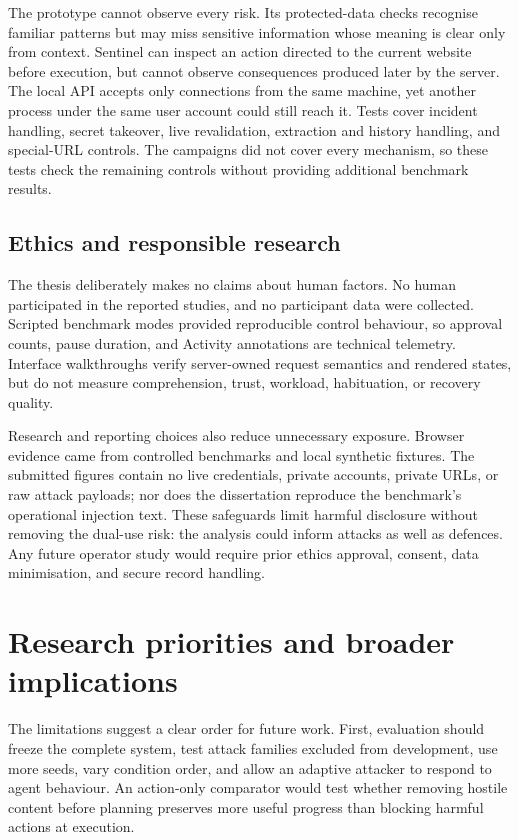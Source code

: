 The prototype cannot observe every risk. Its protected-data checks recognise
familiar patterns but may miss sensitive information whose meaning is clear
only from context. Sentinel can inspect an action directed to the current
website before execution, but cannot observe consequences produced later by the
server. The local API accepts only connections from the same machine, yet
another process under the same user account could still reach it. Tests cover
incident handling, secret takeover, live revalidation, extraction and history
handling, and special-URL controls. The campaigns did not cover every
mechanism, so these tests check the remaining controls without providing
additional benchmark results.

\subsection{Ethics and responsible research}
\label{subsec:ethics}

The thesis deliberately makes no claims about human factors. No human
participated in the reported studies, and no participant data were collected.
Scripted benchmark modes provided reproducible control behaviour, so approval
counts, pause duration, and Activity annotations are technical telemetry.
Interface walkthroughs verify server-owned request semantics and rendered
states, but do not measure comprehension, trust, workload, habituation, or
recovery quality.

Research and reporting choices also reduce unnecessary exposure. Browser
evidence came from controlled benchmarks and local synthetic fixtures. The
submitted figures contain no live credentials, private accounts, private URLs,
or raw attack payloads; nor does the dissertation reproduce the benchmark's
operational injection text. These safeguards limit harmful disclosure without
removing the dual-use risk: the analysis could inform attacks as well as
defences. Any future operator study would require prior ethics approval,
consent, data minimisation, and secure record handling.

\section{Research priorities and broader implications}

The limitations suggest a clear order for future work. First, evaluation should
freeze the complete system, test attack families excluded from development, use
more seeds, vary condition order, and allow an adaptive attacker to respond to
agent behaviour. An action-only comparator would test whether removing hostile
content before planning preserves more useful progress than blocking harmful
actions at execution.

